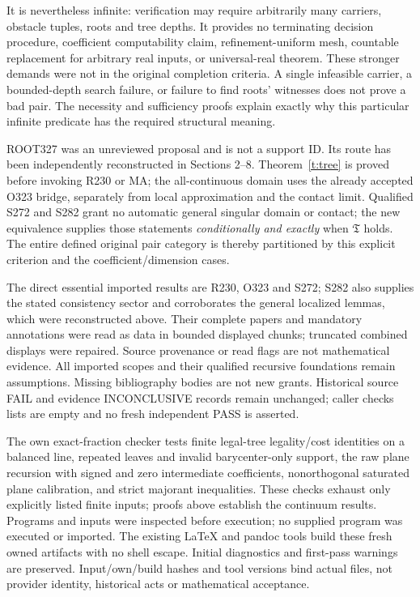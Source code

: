 \documentclass[11pt]{article}
\begin{document}
It is nevertheless infinite: verification may require arbitrarily many carriers, obstacle tuples, roots and tree depths. It provides no terminating decision procedure, coefficient computability claim, refinement-uniform mesh, countable replacement for arbitrary real inputs, or universal-real theorem. These stronger demands were not in the original completion criteria. A single infeasible carrier, a bounded-depth search failure, or failure to find roots' witnesses does not prove a bad pair. The necessity and sufficiency proofs explain exactly why this particular infinite predicate has the required structural meaning.

ROOT327 was an unreviewed proposal and is not a support ID. Its route has been independently reconstructed in Sections 2--8. Theorem~\ref{t:tree} is proved before invoking R230 or MA; the all-continuous domain uses the already accepted O323 bridge, separately from local approximation and the contact limit. Qualified S272 and S282 grant no automatic general singular domain or contact; the new equivalence supplies those statements \emph{conditionally and exactly} when $\mathfrak T$ holds. The entire defined original pair category is thereby partitioned by this explicit criterion and the coefficient/dimension cases.

The direct essential imported results are R230, O323 and S272; S282 also supplies the stated consistency sector and corroborates the general localized lemmas, which were reconstructed above. Their complete papers and mandatory annotations were read as data in bounded displayed chunks; truncated combined displays were repaired. Source provenance or read flags are not mathematical evidence. All imported scopes and their qualified recursive foundations remain assumptions. Missing bibliography bodies are not new grants. Historical source FAIL and evidence INCONCLUSIVE records remain unchanged; caller checks lists are empty and no fresh independent PASS is asserted.

The own exact-fraction checker tests finite legal-tree legality/cost identities on a balanced line, repeated leaves and invalid barycenter-only support, the raw plane recursion with signed and zero intermediate coefficients, nonorthogonal saturated plane calibration, and strict majorant inequalities. These checks exhaust only explicitly listed finite inputs; proofs above establish the continuum results. Programs and inputs were inspected before execution; no supplied program was executed or imported. The existing LaTeX and pandoc tools build these fresh owned artifacts with no shell escape. Initial diagnostics and first-pass warnings are preserved. Input/own/build hashes and tool versions bind actual files, not provider identity, historical acts or mathematical acceptance.
\end{document}
